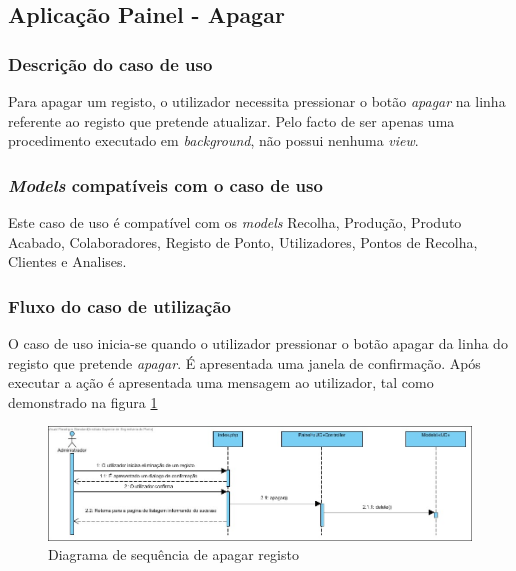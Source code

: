 \subsection{Aplicação Painel - Apagar}
\subsubsection*{Descrição do caso de uso}
Para apagar um registo, o utilizador necessita pressionar o botão \textit{apagar} na linha referente ao registo que pretende atualizar. Pelo facto de ser apenas uma procedimento executado em \textit{background}, não possui nenhuma \textit{view}.

\subsubsection*{\textit{Models} compatíveis com o caso de uso}
Este caso de uso é compatível com os \textit{models} Recolha, Produção, Produto Acabado, Colaboradores, Registo de Ponto, Utilizadores, Pontos de Recolha, Clientes e Analises.

\subsubsection*{Fluxo do caso de utilização}
O caso de uso inicia-se quando o utilizador pressionar o botão apagar da linha do registo que pretende \textit{apagar}. É apresentada uma janela de confirmação. Após executar a ação é apresentada uma mensagem ao utilizador, tal como demonstrado na figura \ref{fig:sd_apagar}


\begin{figure}[H] 
	\begin{center}
		\includegraphics[width=\textwidth,keepaspectratio]{figuras/Diagramas_vp/SD_Painel_4_Apagar.jpg}
		\caption{Diagrama de sequência de apagar registo}
		\label{fig:sd_apagar} 
	\end{center}
\end{figure}